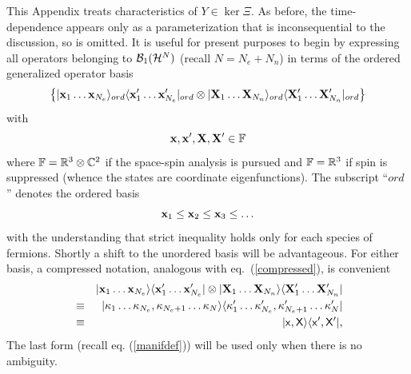 \noindent This Appendix treats characteristics of $Y\in \ker \Xi $. As
before, the time-dependence appears only as a parameterization that is
inconsequential to the discussion, so is omitted. It is useful for present
purposes to begin by expressing all operators belonging to ${\cal B}_{1}(%
{\cal H}^{N})$ (recall $N=N_{e}+N_{n}$) in terms of the ordered generalized
operator basis \cite{BerezinShubin} 
\begin{equation}
\left\{ |{\bf x}_{1}\ldots {\bf x}_{N_{e}}\rangle _{ord}\langle {\bf x}%
_{1}^{\prime }\ldots {\bf x}_{N_{e}}^{\prime }|_{ord}\otimes |{\bf X}%
_{1}\ldots {\bf X}_{N_{n}}\rangle _{ord}\langle {\bf X}_{1}^{\prime }\ldots 
{\bf X}_{N_{n}}^{\prime }|_{ord}\right\}
\end{equation}%
with 
\begin{equation}
{\bf x},{\bf x}^{\prime },{\bf X},{\bf X}^{\prime }\in {\Bbb F}
\end{equation}%
where ${\Bbb F}={\Bbb R}^{3}\otimes {\Bbb C}^{2}$ if the space-spin analysis
is pursued and ${\Bbb F}={\Bbb R}^{3}$ if spin is suppressed (whence the
states are coordinate eigenfunctions). The subscript ``$ord$'' denotes the
ordered basis 
\begin{equation}
{\bf x}_{1}\leq {\bf x}_{2}\leq {\bf x}_{3}\leq \ldots
\end{equation}%
with the understanding that strict inequality holds only for each species of
fermions. Shortly a shift to the unordered basis will be advantageous. For
either basis, a compressed notation, analogous with eq.~(\ref{compressed}),
is convenient 
\begin{eqnarray}
&&|{\bf x}_{1}\ldots {\bf x}_{N_{e}}\rangle \langle {\bf x}_{1}^{\prime
}\ldots {\bf x}_{N_{e}}^{\prime }|\otimes |{\bf X}_{1}\ldots {\bf X}%
_{N_{n}}\rangle \langle {\bf X}_{1}^{\prime }\ldots {\bf X}_{N_{n}}^{\prime
}|  \nonumber \\
&\equiv &|\kappa _{1}\ldots \kappa _{N_{e}},\kappa _{N_{e}+1}\ldots \kappa
_{N}\rangle \langle \kappa _{1}^{\prime }\ldots \kappa _{N_{e}}^{\prime
},\kappa _{N_{e}+1}^{\prime }\ldots \kappa _{N}^{\prime }|  \nonumber \\
&\equiv &|{\sf x},{\sf X}\rangle \langle {\sf x}^{\prime },{\sf X}^{\prime
}|,
\end{eqnarray}%
The last form (recall eq. (\ref{manifdef})) will be used only when there is
no ambiguity.


